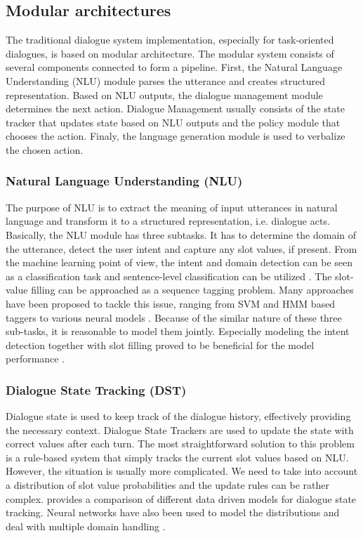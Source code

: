 \subsection{Modular architectures}
\label{sec:relwork-modular}
The traditional dialogue system implementation, especially for task-oriented dialogues, is based on modular architecture.
The modular system consists of several components connected to form a pipeline.
First, the Natural Language Understanding (NLU) module parses the utterance and creates structured representation.
Based on NLU outputs, the dialogue management module determines the next action.
Dialogue Management usually consists of the state tracker that updates state based on NLU outputs and the policy module that chooses the action.
Finaly, the language generation module is used to verbalize the chosen action.
\subsubsection{Natural Language Understanding (NLU)} The purpose of NLU is to extract the meaning of input utterances in natural language and transform it to a structured representation, i.e. dialogue acts.
Basically, the NLU module has three subtasks.
It has to determine the domain of the utterance, detect the user intent and capture any slot values, if present.
From the machine learning point of view, the intent and domain detection can be seen as a classification task and sentence-level classification can be utilized \cite{yaman2008integrative,schapire2000boostexter}.
The slot-value filling can be approached as a sequence tagging problem.
Many approaches have been proposed to tackle this issue, ranging from SVM \cite{shi2016recurrent} and HMM \cite{surendran2006dialog} based taggers to various neural models \cite{adel2016comparing, zhang2017position, mesnil2014using}.
Because of the similar nature of these three sub-tasks, it is reasonable to model them jointly.
Especially modeling the intent detection together with slot filling proved to be beneficial for the model performance \cite{zhang2017position, liu2016attention, xu2013convolutional}.
\subsubsection{Dialogue State Tracking (DST)} Dialogue state is used to keep track of the dialogue history, effectively providing the necessary context.
Dialogue State Trackers are used to update the state with correct values after each turn.
The most straightforward solution to this problem is a rule-based system that simply tracks the current slot values based on NLU.
However, the situation is usually more complicated.
We need to take into account a distribution of slot value probabilities and the update rules can be rather complex.
\citet{vzilka2013comparison} provides a comparison of different data driven models for dialogue state tracking.
Neural networks have also been used to model the distributions \cite{mrkvsic2016neural, zhong2018global} and deal with multiple domain handling \cite{rastogi2017scalable}.

